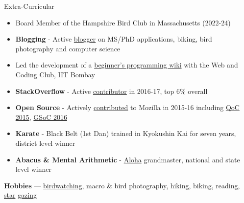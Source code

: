 \documentclass{resume} %
\begin{document}
\begin{rSection}{Extra-Curricular}
\begin{itemize}[leftmargin=*]
\item Board Member of the Hampshire Bird Club in Massachusetts (2022-24)
\item \textbf{Blogging} - Active \href{http://martiansideofthemoon.github.io/archive.html}{blogger} on MS/PhD applications, biking, bird photography and computer science
\item Led the development of a \href{https://www.wncc-iitb.org/wiki/index.php/The_Web_and_Coding_Club}{beginner's programming wiki} with the Web and Coding Club, IIT Bombay
\item \textbf{StackOverflow} - Active \href{https://stackoverflow.com/users/5080995/martianwars}{contributor} in 2016-17, top 6\% overall
\item \textbf{Open Source} - Actively \href{http://martiansideofthemoon.github.io/open_source/}{contributed} to Mozilla in 2015-16 including \href{https://wiki.mozilla.org/Auto-tools/New_Contributor/Quarter_of_Contribution}{QoC 2015}, \href{https://summerofcode.withgoogle.com/archive/2016/projects/}{GSoC 2016}
\item \textbf{Karate} - Black Belt (1st Dan) trained in Kyokushin Kai for seven years, district level winner
\item \textbf{Abacus \& Mental Arithmetic} - \href{https://alohamindmath.com/}{Aloha} grandmaster, national and state level winner
\end{itemize}
\textbf{Hobbies} --- \href{https://martiansideofthemoon.github.io/birding/}{birdwatching}, macro \& bird photography, hiking, biking, reading, \href{https://twitter.com/4cast4you/status/1639131581939077120}{star} \href{https://www.cbsnews.com/boston/news/northern-lights-captivate-stargazers-across-massachusetts/}{gazing}
\end{rSection}
\end{document}
